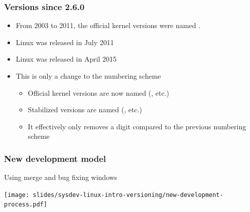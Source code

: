 \begin{frame}
  \frametitle{Versions since 2.6.0}
  \begin{itemize}
  \item From 2003 to 2011, the official kernel versions were named .
  \item Linux  was released in July 2011
  \item Linux  was released in April 2015
  \item This is only a change to the numbering scheme
    \begin{itemize}
    \item Official kernel versions are now named 
      (, etc.)
    \item Stabilized versions are named 
      (, etc.)
    \item It effectively only removes a digit compared to the previous
      numbering scheme
    \end{itemize}
  \end{itemize}
\end{frame}

\begin{frame}
  \frametitle{New development model}
  Using merge and bug fixing windows
  \begin{center}
    \texttt{[image: slides/sysdev-linux-intro-versioning/new-development-process.pdf]}
  \end{center}
\end{frame}

